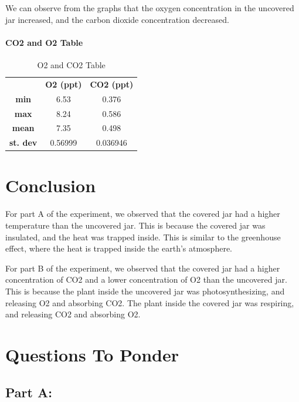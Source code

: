 \documentclass[a4paper, 12pt, english]{article}
\begin{document}
We can observe from the graphs that the oxygen concentration in the uncovered
jar increased, and the carbon dioxide concentration decreased.

\paragraph{CO2 and O2 Table}
\begin{table}[H]
	\caption{\label{tab:Table 3} O2 and CO2 Table}
	\centering
	\begin{tabular}{c c c}
		\toprule
		                 & \textbf{O2 (ppt)}
		                 & \textbf{CO2 (ppt)}            \\
		\cmidrule[0.4pt](r{0.125em}){1-1}%
		\cmidrule[0.4pt](lr{0.125em}){2-2}%
		\cmidrule[0.4pt](lr{0.125em}){3-3}%
		\textbf{min}     & 6.53               & 0.376    \\
		\textbf{max}     & 8.24               & 0.586    \\
		\textbf{mean}    & 7.35               & 0.498    \\
		\textbf{st. dev} & 0.56999            & 0.036946
	\end{tabular}
\end{table}

\section{Conclusion}
For part A of the experiment, we observed that the covered jar had a higher
temperature than the uncovered jar. This is because the covered jar was
insulated, and the heat was trapped inside. This is similar to the greenhouse
effect, where the heat is trapped inside the earth's atmosphere.

For part B of the experiment, we observed that the covered jar had a higher
concentration of CO2 and a lower concentration of O2 than the uncovered jar.
This is because the plant inside the uncovered jar was photosynthesizing, and
releasing O2 and absorbing CO2. The plant inside the covered jar was respiring,
and releasing CO2 and absorbing O2.

\section{Questions To Ponder}
\subsection{Part A:}
\end{document}
